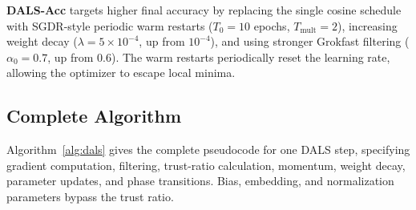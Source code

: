 \documentclass[a4paper,fleqn]{cas-dc}
\begin{document}
\textbf{DALS-Acc} targets higher final accuracy by replacing the single cosine schedule with SGDR-style periodic warm restarts ($T_0 = 10$ epochs, $T_{\text{mult}} = 2$), increasing weight decay ($\lambda = 5 \times 10^{-4}$, up from $10^{-4}$), and using stronger Grokfast filtering ($\alpha_0 = 0.7$, up from $0.6$). The warm restarts periodically reset the learning rate, allowing the optimizer to escape local minima.

\subsection{Complete Algorithm}\label{sec:algorithm}

Algorithm~\ref{alg:dals} gives the complete pseudocode for one DALS step, specifying gradient computation, filtering, trust-ratio calculation, momentum, weight decay, parameter updates, and phase transitions. Bias, embedding, and normalization parameters bypass the trust ratio.
\end{document}
